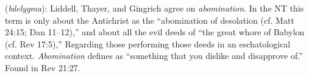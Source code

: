 \item[Abomination,]

(\textit{bdelygma}):
Liddell, Thayer, and Gingrich agree on \emph{abomination}. In the NT this term is only about the Antichrist as the ``abomination of desolation (cf. Matt 24:15; Dan 11--12),'' and about all the evil deeds of ``the great whore of Babylon (cf. Rev 17:5),'' Regarding those performing those deeds in an eschatological context. \emph{Abomination} defines as ``something that you dislike and disapprove of.''
Found in Rev 21:27.
